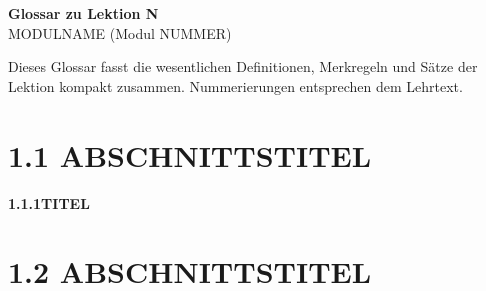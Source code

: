 \documentclass[a4paper,12pt]{article}
\newcommand{\gentry}[3]{%
  \noindent\textbf{#1\quad #2}\nopagebreak\\[0.2em]
  #3\par\smallskip
}
\begin{document}
\begin{center}
  {\LARGE\bfseries Glossar zu Lektion N}\\[0.5em]
  {\large MODULNAME (Modul NUMMER)}
\end{center}

\vspace{1em}

Dieses Glossar fasst die wesentlichen Definitionen, Merkregeln und Sätze
der Lektion kompakt zusammen. Nummerierungen entsprechen dem Lehrtext.

\section*{1.1 \quad ABSCHNITTSTITEL}

\gentry{1.1.1}{TITEL}{%
}



\section*{1.2 \quad ABSCHNITTSTITEL}

\end{document}
